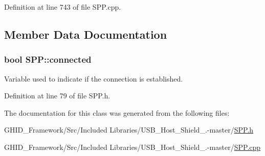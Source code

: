 \-Definition at line 743 of file \-S\-P\-P.\-cpp.



\subsection{\-Member \-Data \-Documentation}
\hypertarget{class_s_p_p_ade5d4f0ab50ddcad14f75fce4450a028}{
\subsubsection[{connected}]{\setlength{\rightskip}{0pt plus 5cm}bool {\bf \-S\-P\-P\-::connected}}}\label{class_s_p_p_ade5d4f0ab50ddcad14f75fce4450a028}
\-Variable used to indicate if the connection is established. 

\-Definition at line 79 of file \-S\-P\-P.\-h.



\-The documentation for this class was generated from the following files\-:\begin{DoxyCompactItemize}
\item 
\-G\-H\-I\-D\-\_\-\-Framework/\-Src/\-Included Libraries/\-U\-S\-B\-\_\-\-Host\-\_\-\-Shield\-\_.-\/master/\hyperlink{_s_p_p_8h}{\-S\-P\-P.\-h}\item 
\-G\-H\-I\-D\-\_\-\-Framework/\-Src/\-Included Libraries/\-U\-S\-B\-\_\-\-Host\-\_\-\-Shield\-\_.-\/master/\hyperlink{_s_p_p_8cpp}{\-S\-P\-P.\-cpp}\end{DoxyCompactItemize}
